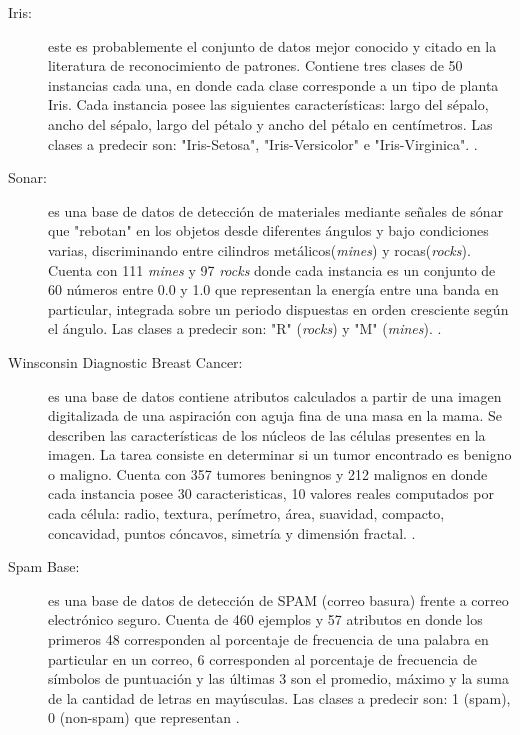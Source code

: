 \documentclass{ci5652}
\begin{document}
\begin{description}
  \item [Iris:] este es probablemente el conjunto de datos mejor conocido y citado
  en la literatura de reconocimiento de patrones. Contiene tres clases de 50
  instancias cada una, en donde cada clase corresponde a un tipo de planta Iris.
  Cada instancia posee las siguientes características: largo del sépalo, ancho 
  del sépalo, largo del pétalo y ancho del pétalo en centímetros. Las clases a
  predecir son: "Iris-Setosa", "Iris-Versicolor" e "Iris-Virginica". 
  \cite{UCI_Iris}.
  
  \item [Sonar:] es una base de datos de detección de materiales mediante señales 
  de sónar que "rebotan" en los objetos desde diferentes ángulos y bajo 
  condiciones varias, discriminando entre cilindros metálicos(\textit{mines}) y
  rocas(\textit{rocks}). Cuenta con 111 \textit{mines} y 97 \textit{rocks} donde
  cada instancia es un conjunto de 60 números entre 0.0 y 1.0 que representan la
  energía entre una banda en particular, integrada sobre un periodo dispuestas 
  en orden cresciente según el ángulo. Las clases a predecir son: "R"
  (\textit{rocks}) y "M" (\textit{mines}). \cite{UCI_Sonar}.
   
  \item [Winsconsin Diagnostic Breast Cancer:] es una base de datos contiene
  atributos calculados a partir de una imagen digitalizada de una aspiración con
  aguja fina de una masa en la mama. Se describen las características de los
  núcleos de las células presentes en la imagen. La tarea consiste en determinar
  si un tumor encontrado es benigno o maligno. Cuenta con 357 tumores beningnos
  y 212 malignos en donde cada instancia posee 30 caracteristicas, 10 valores
  reales computados por cada célula: radio, textura, perímetro, área, suavidad,
  compacto, concavidad, puntos cóncavos, simetría y dimensión fractal.
  \cite{UCI_WDBC}.

  \item [Spam Base:] es una base de datos de detección de SPAM (correo basura)
  frente a correo electrónico seguro. Cuenta de 460 ejemplos y 57 atributos en
  donde los primeros 48 corresponden al porcentaje de frecuencia de una palabra
  en particular en un correo, 6 corresponden al porcentaje de frecuencia de
  símbolos de puntuación y las últimas 3 son el promedio, máximo y la suma de la
  cantidad de letras en mayúsculas. Las clases a predecir son: 1 (spam), 0 
  (non-spam) que representan \cite{UCI_SpamBase}.
  
\end{description}
\end{document}

